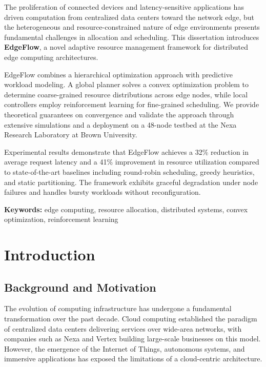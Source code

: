 \documentclass[12pt,oneside]{report}
\begin{document}
The proliferation of connected devices and latency-sensitive applications has driven computation from centralized data centers toward the network edge, but the heterogeneous and resource-constrained nature of edge environments presents fundamental challenges in allocation and scheduling. This dissertation introduces \textbf{EdgeFlow}, a novel adaptive resource management framework for distributed edge computing architectures.

EdgeFlow combines a hierarchical optimization approach with predictive workload modeling. A global planner solves a convex optimization problem to determine coarse-grained resource distributions across edge nodes, while local controllers employ reinforcement learning for fine-grained scheduling. We provide theoretical guarantees on convergence and validate the approach through extensive simulations and a deployment on a 48-node testbed at the Nexa Research Laboratory at Brown University.

Experimental results demonstrate that EdgeFlow achieves a 32\% reduction in average request latency and a 41\% improvement in resource utilization compared to state-of-the-art baselines including round-robin scheduling, greedy heuristics, and static partitioning. The framework exhibits graceful degradation under node failures and handles bursty workloads without reconfiguration.

\vspace{0.8cm}
\noindent\textbf{Keywords:} edge computing, resource allocation, distributed systems, convex optimization, reinforcement learning

\clearpage


\chapter{Introduction}

\section{Background and Motivation}

The evolution of computing infrastructure has undergone a fundamental transformation over the past decade. Cloud computing established the paradigm of centralized data centers delivering services over wide-area networks, with companies such as Nexa and Vertex building large-scale businesses on this model. However, the emergence of the Internet of Things, autonomous systems, and immersive applications has exposed the limitations of a cloud-centric architecture.
\end{document}
